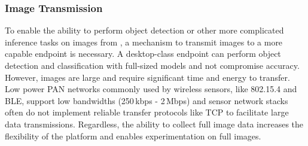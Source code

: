 \subsubsection{Image Transmission}
To enable the ability to perform object detection or other more complicated inference tasks on images from \name, a mechanism to transmit images to a more capable endpoint is necessary. 
A desktop-class endpoint can perform object detection and classification with full-sized models and not compromise accuracy. However, images are large and require significant time and energy to transfer. Low power PAN networks commonly used by wireless sensors, like 802.15.4 and BLE, support low bandwidths (250\,kbps - 2\,Mbps) and sensor network stacks often do not implement reliable transfer protocols like TCP to facilitate large data transmissions. 
Regardless, the ability to collect full image data increases the flexibility of the platform and enables experimentation on full images.




